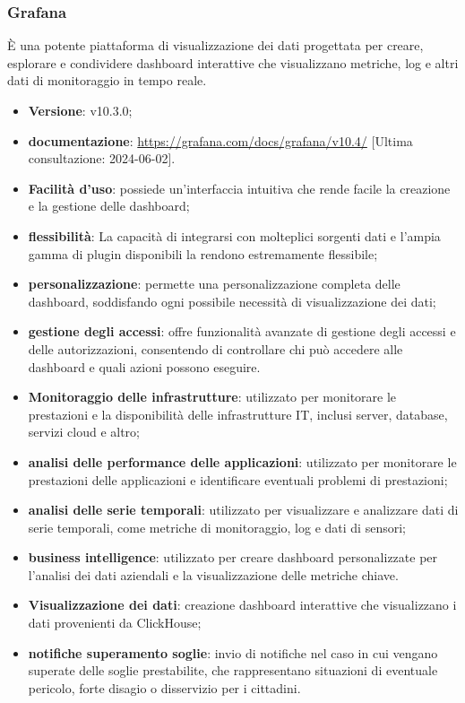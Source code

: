 \subsubsection{Grafana}
È una potente piattaforma di visualizzazione dei dati progettata per creare, esplorare e condividere dashboard interattive che visualizzano metriche, log e altri dati di monitoraggio in tempo reale.

\begin{itemize}
	\item \textbf{Versione}: v10.3.0;
	\item \textbf{documentazione}: \url{https://grafana.com/docs/grafana/v10.4/} [Ultima consultazione: 2024-06-02].
\end{itemize}

\begin{itemize}
	\item \textbf{Facilità d'uso}: possiede un'interfaccia intuitiva che rende facile la creazione e la gestione delle dashboard;
	\item \textbf{flessibilità}: La capacità di integrarsi con molteplici sorgenti dati e l'ampia gamma di plugin disponibili la rendono estremamente flessibile;
	\item \textbf{personalizzazione}: permette una personalizzazione completa delle dashboard, soddisfando ogni possibile necessità di visualizzazione dei dati;
	\item \textbf{gestione degli accessi}: offre funzionalità avanzate di gestione degli accessi e delle autorizzazioni, consentendo di controllare chi può accedere alle dashboard e quali azioni possono eseguire.
\end{itemize}
\begin{itemize}
	\item \textbf{Monitoraggio delle infrastrutture}: utilizzato per monitorare le prestazioni e la disponibilità delle infrastrutture IT, inclusi server, database, servizi cloud e altro;
	\item \textbf{analisi delle performance delle applicazioni}: utilizzato per monitorare le prestazioni delle applicazioni e identificare eventuali problemi di prestazioni;
	\item \textbf{analisi delle serie temporali}: utilizzato per visualizzare e analizzare dati di serie temporali, come metriche di monitoraggio, log e dati di sensori;
	\item \textbf{business intelligence}: utilizzato per creare dashboard personalizzate per l'analisi dei dati aziendali e la visualizzazione delle metriche chiave.
\end{itemize}
\begin{itemize}
	\item \textbf{Visualizzazione dei dati}: creazione dashboard interattive che visualizzano i dati provenienti da ClickHouse;
	\item \textbf{notifiche superamento soglie}: invio di notifiche nel caso in cui vengano superate delle soglie prestabilite, che rappresentano situazioni di eventuale pericolo, forte disagio o disservizio per i cittadini.
\end{itemize}
